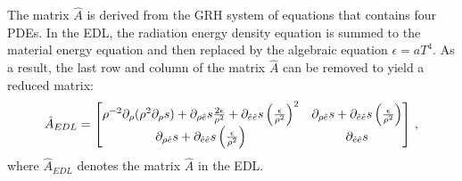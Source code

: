 \documentclass[times,doublespace]{fldauth}%
\begin{document}
The matrix $\hat{A}$ is derived from the GRH system of equations that contains four PDEs. In the EDL, the radiation energy density equation is summed to the material energy equation and then replaced by the algebraic equation $\epsilon=aT^4$. As a result, the last row and column of the matrix $\hat{A}$ can be removed to yield a reduced matrix:
%
\begin{equation}\label{eq:gen-matrix}
\hat{A}_{EDL} = 
\begin{bmatrix}
\rho^{-2}\partial_{\rho}(\rho^2 \partial_{\rho} s) + \partial_{\rho \hat{e}} s\frac{2 \epsilon}{\rho^2} + \partial_{\hat{e} \hat{e}} s \left(\frac{\epsilon}{\rho^2}\right)^2 &
\partial_{\rho \hat{e}} s  + \partial_{\hat{e} \hat{e}} s \left(\frac{\epsilon}{\rho^2}\right) \\
\partial_{\rho \hat{e}} s  + \partial_{\hat{e} \hat{e}} s \left(\frac{\epsilon}{\rho^2}\right) &
\partial_{\hat{e} \hat{e}} s \\
\end{bmatrix} \, ,
\end{equation}
%
where $\hat{A}_{EDL}$ denotes the matrix $\hat{A}$ in the EDL.
\end{document}
